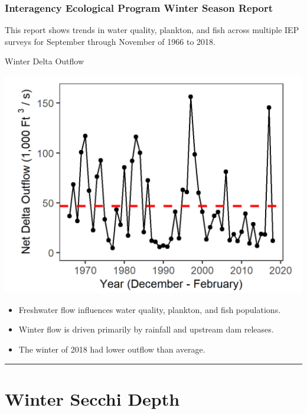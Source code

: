 \documentclass[
]{book}
\providecommand{\tightlist}{%
  \setlength{\itemsep}{0pt}\setlength{\parskip}{0pt}}
\begin{document}
\hypertarget{interagency-ecological-program-winter-season-report}{%
\subsubsection{Interagency Ecological Program Winter Season Report}\label{interagency-ecological-program-winter-season-report}}

This report shows trends in water quality, plankton, and fish across multiple IEP
surveys for September through November of 1966 to 2018.

Winter Delta Outflow

\includegraphics[width=15.25in]{figures/winter_outflow_update}

\begin{itemize}
\tightlist
\item
  Freshwater flow influences water quality, plankton, and fish populations.
\item
  Winter flow is driven primarily by rainfall and upstream dam releases.
\item
  The winter of 2018 had lower outflow than average.
\end{itemize}

\begin{center}\rule{0.5\linewidth}{0.5pt}\end{center}

\hypertarget{winter-secchi-depth}{%
\section{Winter Secchi Depth}\label{winter-secchi-depth}}
\end{document}
